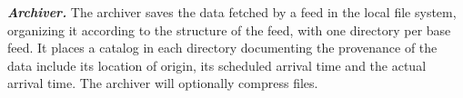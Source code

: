 


    


\textbf{\textit{Archiver.}} The archiver saves the data fetched by a feed 
in the local file system, organizing it according to the structure
of the feed, with one directory per base feed.  
It places a catalog in each directory documenting the provenance of 
the data include its location of origin, its scheduled arrival time and the
actual arrival time. The archiver will optionally compress
files.

